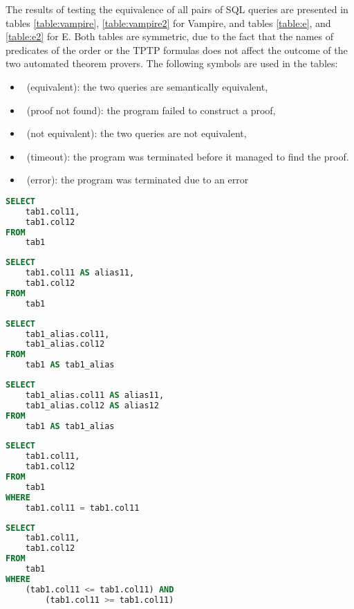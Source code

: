 \documentclass[magisterska,en]{pracamgr}
\begin{document}
The results of testing the equivalence of all pairs of SQL queries are presented in tables \ref{table:vampire}, \ref{table:vampire2} for Vampire, and tables \ref{table:e}, and \ref{table:e2} for E. Both tables are symmetric, due to the fact that the names of predicates of the order or the TPTP formulas does not affect the outcome of the two automated theorem provers.
The following symbols are used in the tables:
\begin{itemize}
    \item \EQ\ (equivalent): the two queries are semantically equivalent,
    \item \NF\ (proof not found): the program failed to construct a proof,
    \item \NE\ (not equivalent): the two queries are not equivalent,
    \item \TO\ (timeout): the program was terminated before it managed to find the proof.
    \item \ER\ (error): the program was terminated due to an error
\end{itemize}

\begin{lstlisting}[language=SQL, caption=Query 1]
SELECT
    tab1.col11,
    tab1.col12
FROM
    tab1
\end{lstlisting}

\begin{lstlisting}[language=SQL, caption=Query 2]
SELECT
    tab1.col11 AS alias11,
    tab1.col12
FROM
    tab1
\end{lstlisting}

\begin{lstlisting}[language=SQL, caption=Query 3]
SELECT
    tab1_alias.col11,
    tab1_alias.col12
FROM
    tab1 AS tab1_alias
\end{lstlisting}

\begin{lstlisting}[language=SQL, caption=Query 4]
SELECT
    tab1_alias.col11 AS alias11,
    tab1_alias.col12 AS alias12
FROM
    tab1 AS tab1_alias
\end{lstlisting}

\begin{lstlisting}[language=SQL, caption=Query 5]
SELECT
    tab1.col11,
    tab1.col12
FROM
    tab1
WHERE
    tab1.col11 = tab1.col11
\end{lstlisting}

\begin{lstlisting}[language=SQL, caption=Query 6]
SELECT
    tab1.col11,
    tab1.col12
FROM
    tab1
WHERE
    (tab1.col11 <= tab1.col11) AND
        (tab1.col11 >= tab1.col11)
\end{lstlisting}
\end{document}

